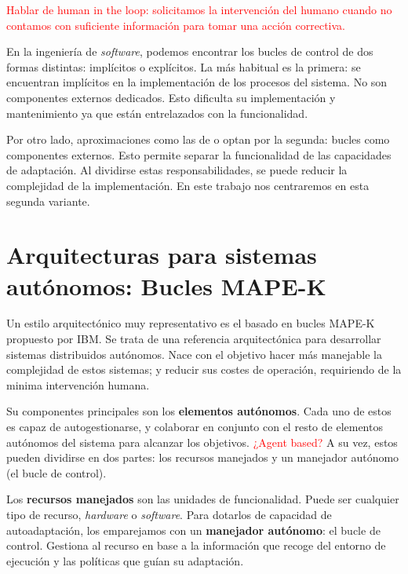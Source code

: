 \textcolor{red}{Hablar de human in the loop: solicitamos la intervención del humano cuando no contamos con suficiente información para tomar una acción correctiva.}

En la ingeniería de \emph{software}, podemos encontrar los bucles de control de dos formas distintas: implícitos o explícitos. La más habitual es la primera: se encuentran implícitos en la implementación de los procesos del sistema. \cite{brunEngineeringSelfAdaptiveSystems2009} No son componentes externos dedicados. Esto dificulta su implementación y mantenimiento ya que están entrelazados con la funcionalidad.

Por otro lado, aproximaciones como las de \cite{garlanIncreasingSystemDependability2003} o \cite{ibmcorporationArchitecturalBlueprintAutonomic2006} optan por la segunda: bucles como componentes externos. Esto permite separar la funcionalidad de las capacidades de adaptación.  Al dividirse estas responsabilidades, se puede reducir la complejidad de la implementación. En este trabajo nos centraremos en esta segunda variante.

\section{Arquitecturas para sistemas autónomos: Bucles MAPE-K}
\label{sec:bucles-mapek}

Un estilo arquitectónico muy representativo es el basado en bucles MAPE-K \cite{ibmcorporationArchitecturalBlueprintAutonomic2006, fonsServiciosAdaptivereadyPara2021} propuesto por IBM. Se trata de una referencia arquitectónica para desarrollar sistemas distribuidos autónomos. Nace con el objetivo hacer más manejable la complejidad de estos sistemas; y reducir sus costes de operación, requiriendo de la minima intervención humana.

Su componentes principales son los \textbf{elementos autónomos}. Cada uno de estos es capaz de autogestionarse, y colaborar en conjunto con el resto de elementos autónomos del sistema  para alcanzar los objetivos. \textcolor{red}{¿Agent based?} A su vez, estos pueden dividirse en dos partes: los recursos manejados y un manejador autónomo (el bucle de control).

Los \textbf{recursos manejados} son las unidades de funcionalidad. Puede ser cualquier tipo de recurso, \emph{hardware} o \emph{software}. Para dotarlos de capacidad de autoadaptación, los emparejamos con un \textbf{manejador autónomo}: el bucle de control. Gestiona al recurso en base a la información que recoge del entorno de ejecución y las políticas que guían su adaptación.

